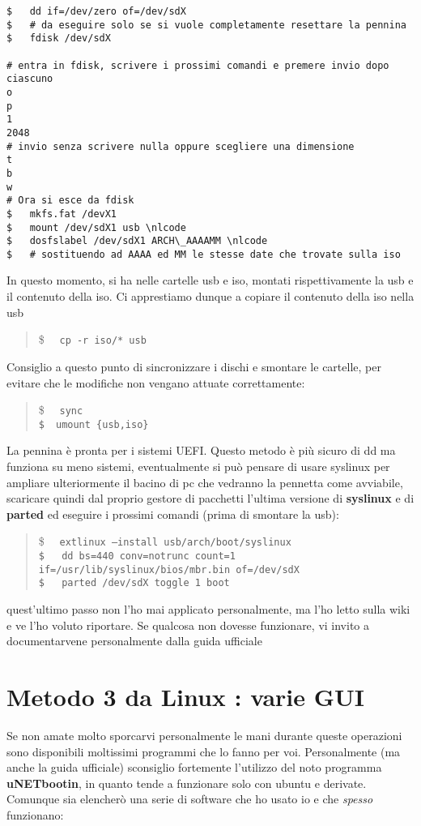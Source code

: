 \documentclass[twoside,italian]{book}
\newcommand{\shellcode}[1]{\$$\quad$ \texttt{#1}}
\newcommand{\centcode}[1]{
	\begin{quote}
		\color{code}
		\shellcode{#1}
	\end{quote}
}
\newcommand{\nlcode}{\\ \$$\quad$}
\begin{document}
    
\begin{lstlisting}
$   dd if=/dev/zero of=/dev/sdX
$   # da eseguire solo se si vuole completamente resettare la pennina
$   fdisk /dev/sdX

# entra in fdisk, scrivere i prossimi comandi e premere invio dopo ciascuno
o
p
1
2048
# invio senza scrivere nulla oppure scegliere una dimensione
t
b
w
# Ora si esce da fdisk
$   mkfs.fat /devX1
$   mount /dev/sdX1 usb \nlcode
$   dosfslabel /dev/sdX1 ARCH\_AAAAMM \nlcode
$   # sostituendo ad AAAA ed MM le stesse date che trovate sulla iso
\end{lstlisting}
    
    In questo momento, si ha nelle cartelle usb e iso, montati rispettivamente la usb e il contenuto della iso. Ci apprestiamo dunque a copiare il contenuto della iso nella usb

    \centcode{cp -r iso/* usb}

    Consiglio a questo punto di sincronizzare  i dischi e smontare le cartelle, per evitare che le modifiche non vengano attuate correttamente:

    \centcode{sync \nlcode umount \{usb,iso\}}

    La pennina è pronta per i sistemi UEFI. Questo metodo è più sicuro di dd ma funziona su meno sistemi, eventualmente si può pensare di usare syslinux per ampliare ulteriormente il bacino di pc che vedranno la pennetta come avviabile, scaricare quindi dal proprio gestore di pacchetti l'ultima versione di \textbf{syslinux} e di \textbf{parted} ed eseguire i prossimi comandi (prima di smontare la usb):

    \centcode{extlinux --install usb/arch/boot/syslinux \nlcode
        dd bs=440 conv=notrunc count=1 if=/usr/lib/syslinux/bios/mbr.bin of=/dev/sdX \nlcode
        parted /dev/sdX toggle 1 boot}

    \begin{tcolorbox}[floatplacement=b,width=\textwidth,colback={white},title={ATTENZIONE:},colbacktitle=red,coltitle=white,colupper=red]

        quest'ultimo passo non l'ho mai applicato personalmente, ma l'ho letto sulla wiki e ve l'ho voluto riportare. Se qualcosa non dovesse funzionare, vi invito a documentarvene personalmente dalla guida ufficiale

    \end{tcolorbox}


\section{Metodo 3 da Linux : varie GUI}
    Se non amate molto sporcarvi personalmente le mani durante queste operazioni sono disponibili moltissimi programmi che lo fanno per voi. Personalmente (ma anche la guida ufficiale) sconsiglio fortemente l'utilizzo del noto programma \textbf{uNETbootin}, in quanto tende a funzionare solo con ubuntu e derivate. Comunque sia elencherò una serie di software che ho usato io e che \textit{spesso} funzionano:
\end{document}
